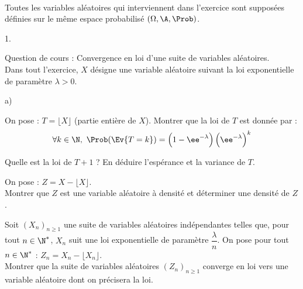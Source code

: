 \documentclass[11pt]{article}
\begin{document}

\begin{exerciceAP}~\\
Toutes les variables aléatoires qui interviennent dans l'exercice sont 
supposées définies sur le même espace probabilisé $(\Omega, 
\A,\Prob)$.
\begin{noliste}{1.}
    \setlength{\itemsep}{2mm}
  \item Question de cours : Convergence en loi d'une suite de variables 
  aléatoires.\\
  Dans tout l'exercice, $X$ désigne une variable aléatoire suivant la 
  loi exponentielle de paramètre $\lambda>0$.
  
  \item 
  \begin{noliste}{a)}
    \setlength{\itemsep}{2mm}
    \item On pose : $T=\lfloor X\rfloor$ (partie entière de $X$). 
    Montrer que la loi de $T$ est donnée par :
    \[
      \forall k \in\N, \ 
      \Prob(\Ev{T=k}) = \Big(1 - \ee^{-\lambda} \Big) \, 
      \Big(\ee^{-\lambda}\Big)^k
    \]
    
    \item Quelle est la loi de $T+1$ ? En déduire l'espérance et la 
    variance de $T$.
  \end{noliste}
  
  \item On pose : $Z=X-\lfloor X\rfloor$.\\
  Montrer que $Z$ est une variable aléatoire à densité et déterminer 
  une densité de $Z$.

  \item Soit $(X_n)_{n\geq 1}$ une suite de variables aléatoires 
  indépendantes telles que, pour tout $n\in\N^*$, $X_n$ suit une loi 
  exponentielle de paramètre $\dfrac{\lambda}{n}$. On pose pour tout 
  $n\in\N^*$ : $Z_n=X_n-\lfloor X_n\rfloor$.\\
  Montrer que la suite de variables aléatoires $(Z_n)_{n\geq 1}$ 
  converge en loi vers une variable aléatoire dont on précisera la loi.
\end{noliste}
\end{exerciceAP}




\end{document}
